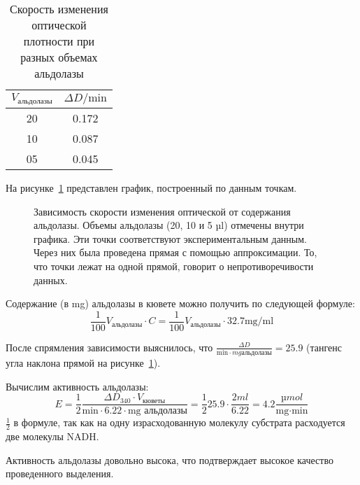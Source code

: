 \begin{table}[htbp]
\caption{Скорость изменения оптической плотности при разных объемах альдолазы}
\begin{tabular}{|c|c|}
\hline
$ V_{\text{альдолазы}} $ & $ \Delta D / \text{min} $ \\
\hline
20 & 0.172 \\
10 & 0.087 \\
05 & 0.045 \\
\hline
\end{tabular}
\label{table-ald-to-delta-d-min}
\end{table}

На рисунке~\ref{act-v-to-delta-d} представлен график,
построенный по данным точкам.

\begin{figure}[htbp]

\caption{Зависимость скорости изменения оптической от содержания альдолазы.
    Объемы альдолазы (20, 10 и 5 µl) отмечены внутри графика.
    Эти точки соответствуют экспериментальным данным.
    Через них была проведена прямая с помощью аппроксимации.
    То, что точки лежат на одной прямой, говорит о непротиворечивости данных.}
\label{act-v-to-delta-d}
\end{figure}

Содержание (в mg) альдолазы в кювете можно получить по следующей формуле:
$$ \frac{1}{100} V_\text{альдолазы} \cdot C =
   \frac{1}{100} V_\text{альдолазы} \cdot 32.7 \text{mg/ml} $$

После спрямления зависимости выяснилось, что
$\frac{\Delta D}{\text{min} \cdot {mg альдолазы}} = 25.9$
(тангенс угла наклона прямой на рисунке~\ref{act-v-to-delta-d}).

Вычислим активность альдолазы:
$$ E = \frac{1}{2} \frac{\Delta D_{340} \cdot V_{кюветы}}{\text{min} \cdot 6.22 \cdot \text{mg альдолазы}} =
    \frac{1}{2} 25.9 \cdot \frac{2 ml}{6.22} = 4.2 \frac{µmol}{\text{mg} \cdot \text{min}} $$
$\frac{1}{2}$ в формуле, так как на одну израсходованную молекулу субстрата
расходуется две молекулы NADH.

Активность альдолазы довольно высока, что подтверждает высокое качество
проведенного выделения.

